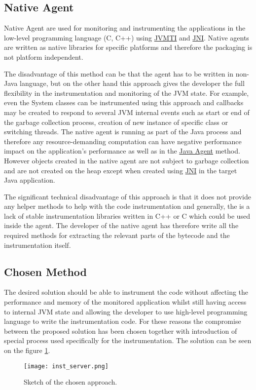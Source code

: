 \subsection{Native Agent}
Native Agent are used for monitoring and instrumenting the applications in the low-level programming language (C, C++) using \hyperref[JVMTI]{JVMTI} and \hyperref[JNI]{JNI}. Native agents are written as native libraries for specific platforms and therefore the packaging is not platform independent. 

The disadvantage of this method can be that the agent has to be written in non-Java language, but on the other hand this approach gives the developer the full flexibility in the instrumentation and monitoring of the JVM state. For example, even the System classes can be instrumented using this approach and callbacks may be created to respond to several JVM internal events such as start or end of the garbage collection process, creation of new instance of specific class or switching threads. The native agent is running as part of the Java process and therefore any resource-demanding computation can have negative performance impact on the application's performance as well as in the \hyperref[java_agent]{Java Agent} method. However objects created in the native agent are not subject to garbage collection and are not created on the heap except when created using \hyperref[JNI]{JNI} in the target Java application.

The significant technical disadvantage of this approach is that it does not provide any helper methods to help with the code instrumentation and generally, the is a lack of stable instrumentation libraries written in C++ or C which could be used inside the agent. The developer of the native agent has therefore write all the required methods for extracting the relevant parts of the bytecode and the instrumentation itself.
\subsection{Chosen Method}
\label{subsec:inst_jvm}
The desired solution should be able to instrument the code without affecting the performance and memory of the monitored application whilst still having access to internal JVM state and allowing the developer to use high-level programming language to write the instrumentation code. For these reasons the compromise between the proposed solution has been chosen together with introduction of special process used specifically for the instrumentation. The solution can be seen on the figure \ref{fig:inst_server_basic}.
\begin{figure}
	\centering
	\texttt{[image: inst\_server.png]}
	\caption{Sketch of the chosen approach.}
	\label{fig:inst_server_basic}
\end{figure}

